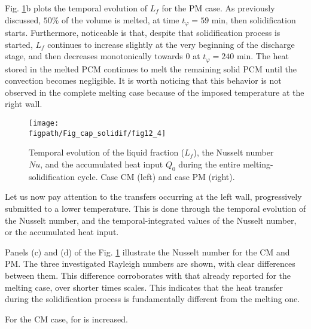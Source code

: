 Fig. \ref{fig:Lf_full_1D_profil}b plots the temporal evolution of $L_f$ for the PM case. 
As previously discussed, $50\%$ of the volume is melted, at time $t_{\varphi} = 59$ min, then solidification starts. 
Furthermore, noticeable is that, despite that solidification process is started, $L_f$ continues to increase slightly at the very beginning of the discharge stage, and then decreases monotonically towards $0$ at $t_{\varphi} = 240$ min.
The heat stored in the melted PCM continues to melt the remaining solid PCM until the convection becomes negligible.
It is worth noticing that this behavior is not observed in the complete melting case because of the imposed temperature at the right wall.  


\begin{figure}
\begin{center}
\begin{minipage}[t]{0.9\textwidth}
	\texttt{[image: \\figpath/Fig\_cap\_solidif/fig12\_4]}
\end{minipage}
\end{center}
\caption{Temporal evolution of the  liquid fraction ($L_f$), the Nusselt number $N\!u$, and the accumulated heat input $Q_0$ during the entire melting-solidification cycle. Case CM  (left) and  case PM  (right).}\label{fig:Lf_full_1D_profil}
\end{figure}

Let us now pay attention to the transfers occurring at the left wall, progressively submitted to a lower temperature. 
This is done through the temporal evolution of the Nusselt number,  and the temporal-integrated values of the Nusselt number, or the accumulated heat input.     

Panels (c) and (d) of the Fig. \ref{fig:Lf_full_1D_profil} illustrate the Nusselt number for the CM and PM.  
The three investigated Rayleigh numbers are shown, with clear differences between them. This difference corroborates with that already reported for the melting case, over shorter times scales.   This indicates that the heat transfer during the solidification process is fundamentally different from the melting one.

For the CM case, for   is increased.

